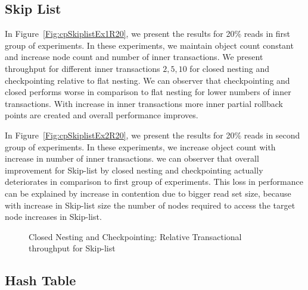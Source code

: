 \documentclass[12pt,english]{report}
\begin{document}
\subsection{Skip List}
In Figure~\ref{Fig:cpSkiplistEx1R20}, we present the results for 20\% reads in first group of experiments. In these experiments, we maintain object count constant and increase node count and number of inner transactions. We present throughput for different inner transactions ${2, 5, 10}$ for closed nesting and checkpointing relative to flat nesting. We can observer that checkpointing and closed performs worse in comparison to flat nesting for lower numbers of inner transactions. With increase in inner transactions more inner partial rollback points are created and overall performance improves.

In Figure~\ref{Fig:cpSkiplistEx2R20}, we present the results for 20\% reads in second group of experiments. In these experiments, we increase object count with increase in number of inner transactions. we can observer that overall improvement for Skip-list by closed nesting and checkpointing actually deteriorates in comparison to first group of experiments. This loss in performance can be explained by increase in contention due to bigger read set size, because with increase in Skip-list size the number of nodes required to access the target node increases in Skip-list.

\begin{figure}[H]
\centering
{}
\end{figure}
\begin{figure}[H]
\centering
{}
\end{figure}
\begin{figure}[H]
\centering
{}
\caption{Closed Nesting and Checkpointing: Relative Transactional throughput for Skip-list}
\label{Fig:cpSkiplist}
\end{figure}

\subsection{Hash Table}
\end{document}
